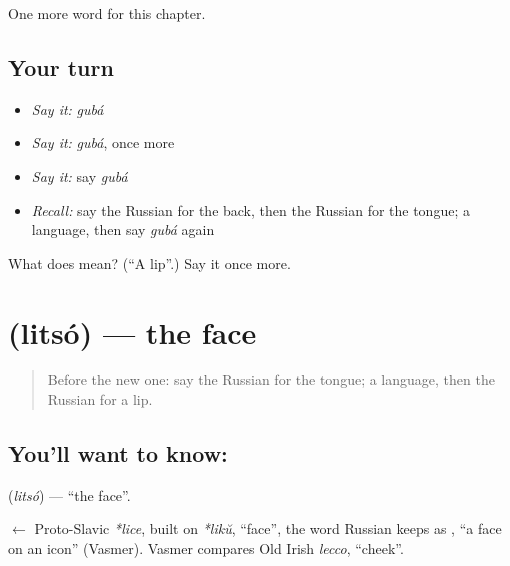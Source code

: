 \begin{grammarlens}[title={What you've built}]
One more word for this chapter.
\end{grammarlens}

\subsection*{Your turn}
\begin{itemize}
\raggedright
  \item \emph{Say it:} \emph{gubá}
  \item \emph{Say it:} \emph{gubá}, once more
  \item \emph{Say it:} say \emph{gubá}
  \item \emph{Recall:} say the Russian for the back, then the Russian for the tongue; a language, then say \emph{gubá} again
\end{itemize}

\begin{tcolorbox}[breakable,colback=teal!4,colframe=teal!35!black,title={Before you move on}]
What does  mean? (\textquotedblleft{}A lip\textquotedblright{}.) Say it once more.
\end{tcolorbox}
\section[\texorpdfstring{\ru{лицо} (litsó)}{лицо (litsó)}]{ (litsó) — the face}

\label{lesson:RU-C31-face}



\begin{quote}
Before the new one: say the Russian for the tongue; a language, then the Russian for a lip.
\end{quote}

\subsection*{You'll want to know: }
\textbf{} (\emph{litsó}) — \textquotedblleft{}the face\textquotedblright{}.

\begin{cousinweb}
\textbf{} $\leftarrow$ Proto-Slavic \emph{*lice}, built on \emph{*likŭ}, \textquotedblleft{}face\textquotedblright{}, the word Russian keeps as \emph{}, \textquotedblleft{}a face on an icon\textquotedblright{} (Vasmer). Vasmer compares Old Irish \emph{lecco}, \textquotedblleft{}cheek\textquotedblright{}.
\end{cousinweb}

